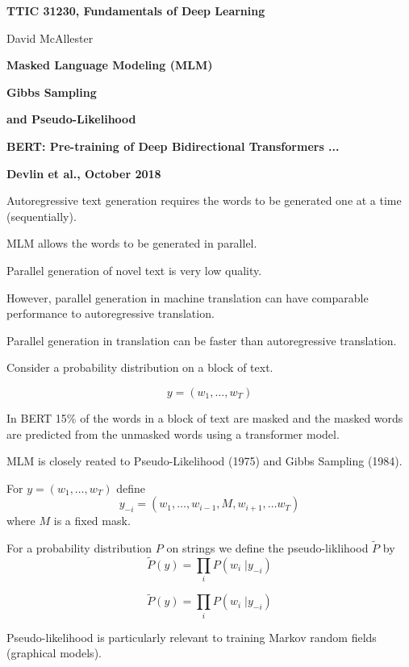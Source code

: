 




{\Huge

  \centerline{\bf TTIC 31230, Fundamentals of Deep Learning}
  \bigskip
  \centerline{David McAllester}
  \vfill
  \vfill
  \centerline{\bf Masked Language Modeling (MLM)}
  \vfill
  \centerline{\bf Gibbs Sampling}
  \vfill
  \centerline{\bf and Pseudo-Likelihood}
\vfill
\vfill
\vfill


\centerline{\bf BERT: Pre-training of Deep Bidirectional Transformers ...}
\centerline{\bf Devlin et al., October 2018}


Autoregressive text generation requires the words to be generated one at a time (sequentially).

\vfill
MLM allows the words to be generated in parallel.

\vfill
Parallel generation of novel text is very low quality.

\vfill
However, parallel generation in machine translation can have comparable performance to autoregressive translation.

\vfill
Parallel generation in translation can be faster than autoregressive translation.


Consider a probability distribution on a block of text.

$$y = (w_1, \dots, w_T)$$

\vfill
In BERT 15\% of the words in a block of text are masked and the masked words are predicted from the unmasked words using a transformer model.


MLM is closely reated to Pseudo-Likelihood (1975) and Gibbs Sampling (1984).

\vfill
For $y = (w_1,\ldots,w_T)$ define
$$y_{-i} = (w_1,\ldots,w_{i-1},M,w_{i+1},\ldots w_T)$$
where $M$ is a fixed mask.

\vfill
For a probability distribution $P$ on strings we define the pseudo-liklihood $\tilde{P}$ by
$$\tilde{P}(y) = \prod_i P(w_i\;|y_{-i})$$

$$\tilde{P}(y) = \prod_i P(w_i\;|y_{-i})$$

\vfill
Pseudo-likelihood is particularly relevant to training Markov random fields (graphical models).

}
